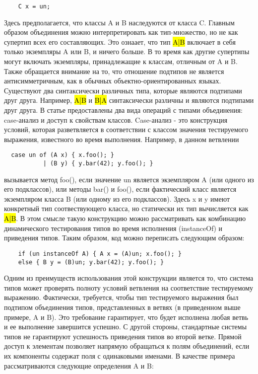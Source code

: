 \begin{lstlisting}
    C x = un;
\end{lstlisting}

Здесь предполагается, что классы A и B наследуются от класса C.
Главным образом объединения можно интерпретировать как тип-множество, но не как супертип всех его составляющих.
Это ознаает, что тип \hl{A|B} включает в себя только экземпляры A или B, и ничего больше.
В то время как другие супертипы могут включать экземпляры, принадлежащие к классам, отличным от A и B\@.
Также обращается внимание на то, что отношение подтипов не является антисимметричным, как в обычных
объектно-ориентированных языках.
Существуют два синтаксически различных типа, которые являются подтипами друг друга.
Например, \hl{A|B} и \hl{B|A} синтаксически различны и являются подтипами друг друга.
В статье предоставлены два вида операций с типами объединения: case-анализ и доступ к свойствам классов.
Case-анализ - это конструкция условий, которая разветвляется в соответствии с
классом значения тестируемого выражения, известного во время выполнения.
Например, в данном ветвлении

\begin{lstlisting}
  case un of (A x) { x.foo(); }
           | (B y) { y.bar(42); y.foo(); }
\end{lstlisting}

вызывается метод foo(), если значение un является экземпляром A (или одного из его подклассов), или методы bar() и foo(),
если фактический класс является экземпляром класса B (или одному из его подклассов).
Здесь x и y имеют конкретный тип соотвествующего класса, но статически их тип вычисляется как \hl{A|B}.
В этом смысле такую конструкцию можно рассматривать как комбинацию динамического тестирования типов
во время исполнения (instanceOf) и приведения типов.
Таким образом, код можно переписать следующим образом:

\begin{lstlisting}
    if (un instanceOf A) { A x = (A)un; x.foo(); }
    else { B y = (B)un; y.bar(42); y.foo(); }
\end{lstlisting}

Одним из преимуществ использования этой конструкции является то, что система типов может проверять полноту
условий ветвления на соответствие тестируемому выражению.
Фактически, требуется, чтобы тип тестируемого выражения был подтипом объединения типов, представленных в ветвях (в
приведенном выше примере, A и B).
Это требование гарантирует, что будет исполнена любая ветвь и ее выполнение завершится успешно.
С другой стороны, стандартные системы типов не гарантируют успешность приведения типов во второй ветке.
Прямой доступ к элементам позволяет напрямую обращаться к полям объединений, если их компоненты содержат поля с
одинаковыми именами.
В качестве примера рассматриваются следующие определения A и B:

